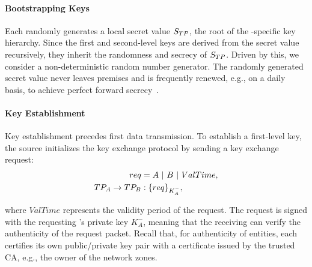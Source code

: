 \paragraph{Bootstrapping Keys}
Each \tp randomly generates a local secret value $S_{TP}$, the root of the \tp-specific 
key hierarchy. Since the first and second-level keys are derived from the secret value 
recursively, they inherit the randomness and secrecy of $S_{TP}$. Driven by this, we 
consider a non-deterministic random number generator. The randomly generated secret value 
never leaves \tp premises and is frequently renewed, e.g., on a daily basis, to achieve 
perfect forward secrecy~\cite{rfc1363}.




\paragraph{Key Establishment}
Key establishment precedes first data transmission. To establish a first-level key, 
the source \tp initializes the key exchange protocol by sending a key exchange request:
\noindent
\begin{subequations}
	\begin{align}
		req                     & = A~|~B~|~ValTime, \\
		TP_A \rightarrow TP_B & : \{req\}_{K^-_A}, 
	\end{align}
	\label{eq:req}
\end{subequations}

\noindent 
where $ValTime$ represents the validity period of the request. The request is signed with
the requesting \tp's private key ${K^-_A}$, meaning that the receiving \tp can verify the
authenticity of the request packet. Recall that, for authenticity of \name entities, each
\tp certifies its own public/private key pair with a certificate issued by the trusted CA,
e.g., the owner of the network zones.

